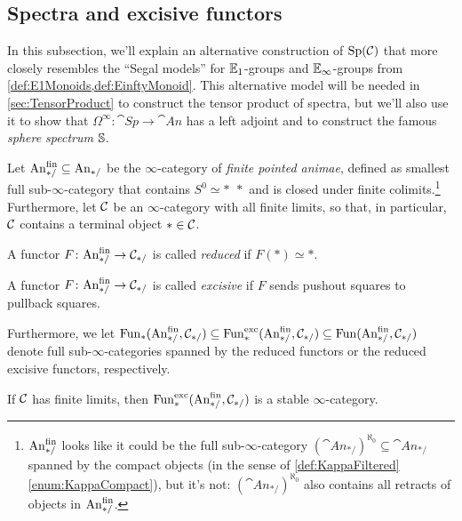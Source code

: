 \subsection{Spectra and excisive functors}
In this subsection, we'll explain an alternative construction of $\mathrm{Sp}(\mathcal{C})$ that more closely resembles the \enquote{Segal models} for $\mathbb{E}_1$-groups and $\mathbb{E}_\infty$-groups from \cref{def:E1Monoids,def:EinftyMonoid}. This alternative model will be needed in \cref{sec:TensorProduct} to construct the tensor product of spectra, but we'll also use it to show that $\Omega^\infty \colon \cat{Sp}\rightarrow \cat{An}$ has a left adjoint and to construct the famous \emph{sphere spectrum} $\mathbb{S}$.
\begin{defi}\label{def:Excisive}
	Let $\FinAn\subseteq \cat{An}_{*/}$ be the $\infty$-category of \emph{finite pointed animae}, defined as smallest full sub-$\infty$-category that contains ${S^0}\simeq *\ \,*$ and is closed under finite colimits.\footnote{$\FinAn$ looks like it could be the full sub-$\infty$-category $(\cat{An}_{*/})^{\aleph_0}\subseteq \cat{An}_{*/}$ spanned by the compact objects (in the sense of \cref{def:KappaFiltered}\cref{enum:KappaCompact}), but it's not: $(\cat{An}_{*/})^{\aleph_0}$ also contains all retracts of objects in $\FinAn$.} Furthermore, let $\mathcal{C}$ be an $\infty$-category with all finite limits, so that, in particular, $\mathcal{C}$ contains a terminal object $*\in\mathcal{C}$.
	\begin{alphanumerate}
		\item A functor $F\colon \FinAn\rightarrow \Cc_{*/}$ is called \emph{reduced} if $F(*)\simeq *$.\label{enum:Reduced}
		\item A functor $F\colon \FinAn\rightarrow \Cc_{*/}$ is called \emph{excisive} if $F$ sends pushout squares to pullback squares.\label{enum:Excisibe}
	\end{alphanumerate}
	Furthermore, we let $\Fun_*(\FinAn,\Cc_{*/})\subseteq \Fun_*^\mathrm{exc}(\FinAn,\Cc_{*/})\subseteq\Fun(\FinAn,\Cc_{*/})$ denote full sub-$\infty$-categories spanned by the reduced functors or the reduced excisive functors, respectively.
\end{defi}
\begin{lem}\label{lem:FunExcStable}
	If $\mathcal{C}$ has finite limits, then $\Fun_*^\mathrm{exc}(\FinAn,\Cc_{*/})$ is a stable $\infty$-category.
\end{lem}
